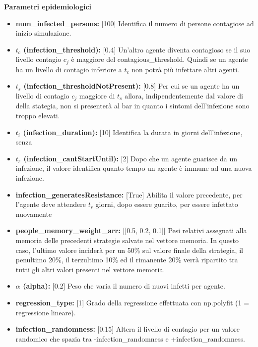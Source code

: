 \documentclass{article}
\begin{document}
{    
    \textbf{Parametri epidemiologici}
    \begin{itemize}
        \item \textbf{num\_infected\_persons:} [100] Identifica il numero di persone contagiose ad inizio simulazione.
        \item \textbf{$t_{c}$ (infection\_threshold):} [0.4] Un'altro agente diventa contagioso se il suo livello contagio $c_{j}$ è maggiore del contagious\_threshold. Quindi se un agente ha un livello di contagio inferiore a $t_{c}$ non potrà più infettare altri agenti.
        \item \textbf{$t_{s}$ (infection\_thresholdNotPresent):} [0.8] Per cui se un agente ha un livello di contagio $c_{j}$ maggiore di $t_{s}$ allora, indipendentemente dal valore di della stategia, non si presenterà al bar in quanto i sintomi dell'infezione sono troppo elevati.
        \item \textbf{$t_{i}$ (infection\_duration):} [10] Identifica la durata in giorni dell'infezione, senza
        \item \textbf{$t_{r}$ (infection\_cantStartUntil):} [2] Dopo che un agente guarisce da un infezione, il valore identifica quanto tempo un agente è immune ad una nuova infezione.
        \item \textbf{infection\_generatesResistance:} [True] Abilita il valore precedente, per l'agente deve attendere $t_{r}$ giorni, dopo essere guarito, per essere infettato nuovamente
        \item \textbf{people\_memory\_weight\_arr:} [[0.5, 0.2, 0.1]] Pesi relativi assegnati alla memoria delle precedenti strategie salvate nel vettore memoria. In questo caso, l'ultimo valore inciderà per un 50\% sul valore finale della strategia, il penultimo 20\%, il terzultimo 10\% ed il rimanente 20\% verrà ripartito tra tutti gli altri valori presenti nel vettore memoria.
        \item \textbf{$\alpha$ (alpha):} [0.2] Peso che varia il numero di nuovi infetti per agente.
        \item \textbf{regression\_type:} [1] Grado della regressione effettuata con np.polyfit (1 = regressione lineare).
        \item \textbf{infection\_randomness:} [0.15] Altera il livello di contagio per un valore randomico che spazia tra -infection\_randomness e +infection\_randomness.\newline
    \end{itemize}
    
}
\end{document}
